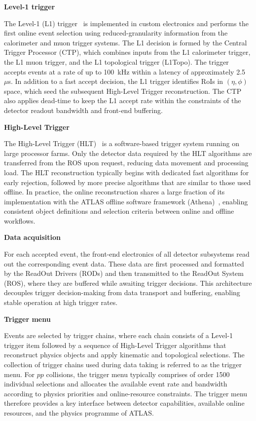 \textbf{Level-1 trigger}

The Level-1 (L1) trigger~\cite{ATLASTDR12} is implemented in custom electronics and performs the first online event selection using reduced-granularity information from the calorimeter and muon trigger systems.
The L1 decision is formed by the Central Trigger Processor (CTP), which combines inputs from the L1 calorimeter trigger, the L1 muon trigger, and the L1 topological trigger (L1Topo).
The trigger accepts events at a rate of up to 100~kHz within a latency of approximately 2.5~$\mu$s.
In addition to a fast accept decision, the L1 trigger identifies RoIs in $(\eta,\phi)$ space, which seed the subsequent High-Level Trigger reconstruction.
The CTP also applies dead-time to keep the L1 accept rate within the constraints of the detector readout bandwidth and front-end buffering.

\vspace{0.5em}

\textbf{High-Level Trigger}

The High-Level Trigger (HLT)~\cite{ATLASTDR16} is a software-based trigger system running on large processor farms.
Only the detector data required by the HLT algorithms are transferred from the ROS upon request, reducing data movement and processing load.
The HLT reconstruction typically begins with dedicated fast algorithms for early rejection, followed by more precise algorithms that are similar to those used offline.
In practice, the online reconstruction shares a large fraction of its implementation with the ATLAS offline software framework (Athena)~\cite{AthenaZenodo2019}, enabling consistent object definitions and selection criteria between online and offline workflows.

\vspace{0.5em}

\textbf{Data acquisition}

For each accepted event, the front-end electronics of all detector subsystems read out the corresponding event data.
These data are first processed and formatted by the ReadOut Drivers (RODs) and then transmitted to the ReadOut System (ROS), where they are buffered while awaiting trigger decisions.
This architecture decouples trigger decision-making from data transport and buffering, enabling stable operation at high trigger rates.

\vspace{0.5em}

\textbf{Trigger menu}

Events are selected by trigger chains, where each chain consists of a Level-1 trigger item followed by a sequence of High-Level Trigger algorithms that reconstruct physics objects and apply kinematic and topological selections.
The collection of trigger chains used during data taking is referred to as the trigger menu.
For $pp$ collisions, the trigger menu typically comprises of order 1500 individual selections and allocates the available event rate and bandwidth according to physics priorities and online-resource constraints.
The trigger menu therefore provides a key interface between detector capabilities, available online resources, and the physics programme of ATLAS.

